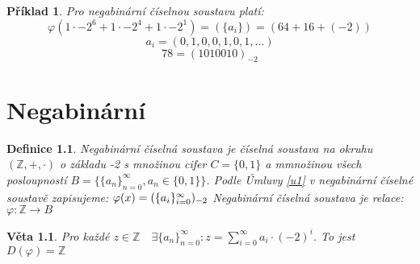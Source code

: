 \documentclass[12pt]{book}
\newtheorem{definice}{Definice}
\newtheorem{veta}{Věta}
\newtheorem*{pr}{Příklad}
\begin{document}
\begin{pr}
	Pro negabinární číselnou soustavu platí:
	$$\varphi(1\cdot-2^6+1\cdot-2^4+1\cdot-2^1)=(\{a_i\})=(64+16+(-2))$$
	$${a_i}=(0,1,0,0,1,0,1,\dots) $$
	$$78 =(1010010)_{-2}$$
\end{pr}




\chapter{Negabinární}

\begin{definice}
	Negabinární číselná soustava je číselná soustava na okruhu $(\mathbb{Z},+,\cdot)$ o základu -2 s množinou cifer $C=\{0,1\}$ a mmnožinou všech posloupností
	$B=\{\{a_n\}_{n=0}^\infty,a_n \in \{0,1\} \}$.\newline
	Podle Úmluvy \ref{u1} v negabinární číselné soustavě zapisujeme:
	$\varphi(x) = (\{a_i\}_{i=0}^{\infty})_{-2}$\newline
	Negabinární číselná soustava je relace:
	$\varphi:\mathbb{Z}\to B$
\end{definice}
\begin{veta}
	Pro každé $z \in \mathbb{Z} \quad \exists\{a_n\}_{n=0}^\infty:z=\sum_{i=0}^{\infty}a_i\cdot(-2)^i$. To jest $D(\varphi)=\mathbb{Z}$
\end{veta}
\end{document}
